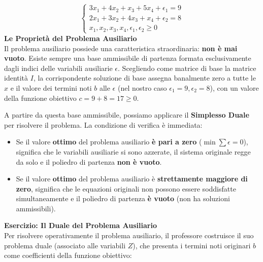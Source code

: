 \documentclass[12pt, a4paper]{article}
\newcommand{\separatore}{\noindent{\color{titlecolor!50}\rule{\textwidth}{0.6pt}}}
\begin{document}
	$$\begin{cases} 3x_1 + 4x_2 + x_3 + 5x_4 + \epsilon_1 = 9 \\ 2x_1 + 3x_2 + 4x_3 + x_4 + \epsilon_2 = 8 \\ x_1, x_2, x_3, x_4, \epsilon_1, \epsilon_2 \geq 0 \end{cases}$$
	\vspace{0.4cm}
	\textbf{Le Proprietà del Problema Ausiliario}\\
	Il problema ausiliario possiede una caratteristica straordinaria: \textbf{non è mai vuoto}.
	Esiste sempre una base ammissibile di partenza formata esclusivamente dagli indici delle variabili ausiliarie $\epsilon$. Scegliendo come matrice di base la matrice identità $I$, la corrispondente soluzione di base assegna banalmente zero a tutte le $x$ e il valore dei termini noti $b$ alle $\epsilon$ (nel nostro caso $\epsilon_1 = 9, \epsilon_2 = 8$), con un valore della funzione obiettivo $c = 9+8 = 17 \geq 0$.
	
	A partire da questa base ammissibile, possiamo applicare il \textbf{Simplesso Duale} per risolvere il problema.
	La condizione di verifica è immediata:
	\begin{itemize}[label=\textcolor{titlecolor}{\Large\textbullet}, itemsep=2pt, leftmargin=1.5cm]
		\item Se il valore \textbf{ottimo} del problema ausiliario \textbf{è pari a zero} ($\min \sum \epsilon = 0$), significa che le variabili ausiliarie si sono azzerate, il sistema originale regge da solo e il poliedro di partenza \textbf{non è vuoto}.
		\item Se il valore \textbf{ottimo} del problema ausiliario è \textbf{strettamente maggiore di zero}, significa che le equazioni originali non possono essere soddisfatte simultaneamente e il poliedro di partenza \textbf{è vuoto} (non ha soluzioni ammissibili).
	\end{itemize}
	
	\vspace{0.6cm}
	\separatore
	\vspace{0.4cm}
	
	\textbf{Esercizio: Il Duale del Problema Ausiliario}\\
	Per risolvere operativamente il problema ausiliario, il professore costruisce il suo problema duale (associato alle variabili $Z$), che presenta i termini noti originari $b$ come coefficienti della funzione obiettivo:
	
\end{document}
